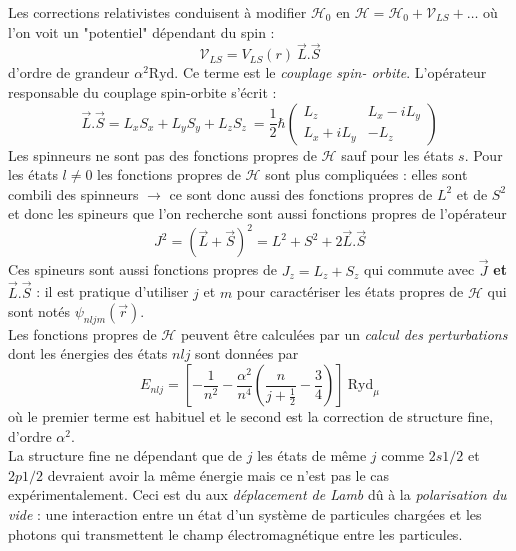 \documentclass	[11pt, a4paper, openany]{book}
\begin{document}
	Les corrections relativistes conduisent à modifier $\mathcal{H}_0$ en $\mathcal{H} = 
	\mathcal{H}_0 + \mathcal{V}_{LS} + \dots$ où l'on voit un "potentiel" dépendant du 
	spin :
	\begin{equation}
	\mathcal{V}_{LS} = V_{LS}(r)\ \vec{L}.\vec{S}
	\end{equation}
	d'ordre de grandeur $\alpha^2\text{Ryd}$. Ce terme est le \textit{couplage spin-
	orbite}. L'opérateur responsable du couplage spin-orbite s'écrit : 
	\begin{equation}
	\vec{L}.\vec{S} = L_xS_x + L_yS_y + L_zS_z\ = \frac{1}{2}\hbar\left(\begin{array}{cc}
	 L_z & L_x-iL_y\\
	 L_x+iL_y & -L_z
	 \end{array}\right)
	\end{equation}
	Les spinneurs ne sont pas des fonctions propres de $\mathcal{H}$ sauf pour les états
	$s$. Pour les états $l\neq 0$ les fonctions propres de $\mathcal{H}$ sont plus 
	compliquées : elles sont combili des spinneurs $\rightarrow$ ce sont donc aussi des
	fonctions propres de $L^2$ et de $S^2$ et donc les spineurs que l'on recherche sont 
	aussi fonctions propres de l'opérateur 
	\begin{equation}
	J^2 = (\vec{L}+\vec{S})^2 = L^2 + S^2 + 2\vec{L}.\vec{S}
	\end{equation}
	Ces spineurs sont aussi fonctions propres de $J_z = L_z+S_z$ qui commute avec $\vec{
	J}$ \textbf{et} $\vec{L}.\vec{S}$ : il est pratique d'utiliser $j$ et $m$ pour 
	caractériser les états propres de $\mathcal{H}$ qui sont notés $\psi_{nljm}(\vec{r})$.\\
	
	Les fonctions propres de $\mathcal{H}$ peuvent être calculées par un \textit{calcul 
	des perturbations} dont les énergies des états $nlj$ sont données par 
	\begin{equation}
	E_{nlj} = \left[-\frac{1}{n^2} - \frac{\alpha^2}{n^4}\left(\frac{n}{j+\frac{1}{2}}-
	\frac{3}{4}\right)\right]\ \text{Ryd}_\mu
	\end{equation}
	où le premier terme est habituel et le second est la correction de structure fine, 
	d'ordre $\alpha^2$.\\
	La structure fine ne dépendant que de $j$ les états de m\^eme $j$ comme $2s1/2$ et $2p1/2$ 
	devraient avoir	la m\^eme énergie mais ce n'est pas le cas expérimentalement. Ceci 
	est du aux \textit{déplacement de Lamb} d\^u à la \textit{polarisation du vide} :
	une interaction entre un état d'un système de particules chargées et les photons qui 
	transmettent le champ électromagnétique entre les particules.
	
\end{document}
